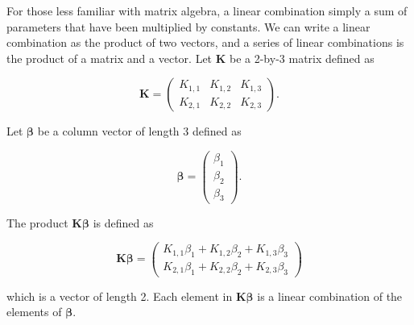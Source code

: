 \documentclass[
  letterpaper,
  DIV=11,
  numbers=noendperiod]{scrreprt}
\theoremstyle{definition}
\theoremstyle{definition}
\theoremstyle{remark}
\begin{document}
\begin{tcolorbox}[enhanced jigsaw, bottomrule=.15mm, titlerule=0mm, bottomtitle=1mm, colback=white, coltitle=black, rightrule=.15mm, leftrule=.75mm, toprule=.15mm, toptitle=1mm, left=2mm, opacityback=0, colframe=quarto-callout-note-color-frame, breakable, title=\textcolor{quarto-callout-note-color}{\faInfo}\hspace{0.5em}{Note}, arc=.35mm, colbacktitle=quarto-callout-note-color!10!white, opacitybacktitle=0.6]

For those less familiar with matrix algebra, a linear combination simply
a sum of parameters that have been multiplied by constants. We can write
a linear combination as the product of two vectors, and a series of
linear combinations is the product of a matrix and a vector. Let
\(\mathbf{K}\) be a 2-by-3 matrix defined as

\[\mathbf{K} = \begin{pmatrix} 
   K_{1,1} & K_{1,2} & K_{1,3} \\
   K_{2,1} & K_{2,2} & K_{2,3} \end{pmatrix}.\]

Let \(\boldsymbol{\beta}\) be a column vector of length 3 defined as

\[\boldsymbol{\beta} = \begin{pmatrix}
   \beta_1 \\
   \beta_2 \\
   \beta_3 \end{pmatrix}.\]

The product \(\mathbf{K} \boldsymbol{\beta}\) is defined as

\[\mathbf{K}\boldsymbol{\beta} = \begin{pmatrix}
   K_{1,1} \beta_1 + K_{1,2} \beta_2 + K_{1,3} \beta_3 \\
   K_{2,1} \beta_1 + K_{2,2} \beta_2 + K_{2,3} \beta_3 \end{pmatrix}\]

which is a vector of length 2. Each element in
\(\mathbf{K}\boldsymbol{\beta}\) is a linear combination of the elements
of \(\boldsymbol{\beta}\).

\end{tcolorbox}
\end{document}

